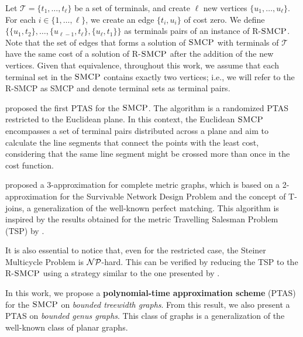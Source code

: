 Let \(\mathcal{T} = \{t_1, \dots, t_\ell\}\) be a set of terminals, and create \(\ell\) new vertices \(\{u_1, \dots, u_\ell\}\). For each \(i \in \{1, \ldots, \ell\}\), we create an edge \(\{t_i, u_i\}\) of cost zero. We define \(\{\{u_1, t_2\}, \dots, \{u_{\ell-1}, t_\ell\}, \{u_\ell, t_1\}\}\) as terminals pairs of an instance of R-\(\textsc{SMCP}\). Note that the set of edges that forms a solution of \(\textsc{SMCP}\) with terminals of \(\mathcal{T}\) have the same cost of a solution of R-\(\textsc{SMCP}\) after the addition of the new vertices. Given that equivalence, throughout this work, we assume that each terminal set in the \(\textsc{SMCP}\) contains exactly two vertices; i.e., we will refer to the R-SMCP as SMCP and denote terminal sets as terminal pairs.

\cite{LINTZMAYER2020134} proposed the first PTAS for the \(\textsc{SMCP}\). The algorithm is a randomized PTAS restricted to the Euclidean plane. In this context, the Euclidean \(\textsc{SMCP}\) encompasses a set of terminal pairs distributed across a plane and aim to calculate the line segments that connect the points with the least cost, considering that the same line segment might be crossed more than once in the cost function.

\cite{smcp_3apx} proposed a 3-approximation for complete metric graphs, which is based on a 2-approximation for the Survivable Network Design Problem and the concept of T-joins, a generalization of the well-known perfect matching. This algorithm is inspired by the results obtained for the metric Travelling Salesman Problem (TSP) by \cite{Christofides2022WorstCaseAO}.

It is also essential to notice that, even for the restricted case, the Steiner Multicycle Problem is \(\mathcal{NP}\)-hard. This can be verified by reducing the TSP to the R-\(\textsc{SMCP}\) using a strategy similar to the one presented by \citeauthor{LINTZMAYER2020134}.

In this work, we propose a \textbf{polynomial-time approximation scheme} (PTAS) for the \(\textsc{SMCP}\) on \textit{bounded treewidth graphs}. From this result, we also present a PTAS on \textit{bounded genus graphs}. This class of graphs is a generalization of the well-known class of planar graphs.


